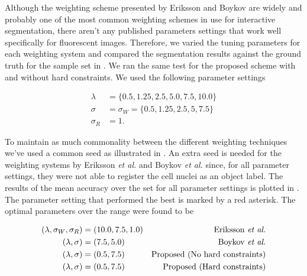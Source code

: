 Although the weighting scheme presented by Eriksson \citep{Eriksson2006} and Boykov \citep{Boykov2001_2} are widely and probably one of the most common weighting schemes in use for interactive segmentation, there aren't any published parameters settings that work well specifically for fluorescent images. Therefore, we varied the tuning parameters for each weighting system and compared the segmentation results against the ground truth for the sample set in . We ran the same test for the proposed scheme with and without hard constraints. We used the following parameter settings

\begin{align*}
	\lambda & = \{ 0.5, 1.25, 2.5, 5.0, 7.5, 10.0 \}\\
	\sigma & = \sigma_W = \{ 0.5, 1.25, 2.5, 5, 7.5 \}\\
	\sigma_R & = 1.
\end{align*}

To maintain as much commonality between the different weighting techniques we've used a common seed as illustrated in . An extra seed is needed for the weighting systems by Eriksson \textit{et al.} and Boykov \textit{et al.} since, for all parameter settings, they were not able to register the cell nuclei as an object label. The results of the mean accuracy over the set for all parameter settings is plotted in . The parameter setting that performed the best is marked by a red asterisk. The optimal parameters over the range were found to be 

\begin{align*}
	( \lambda, \sigma_W, \sigma_R ) &= (10.0, 7.5, 1.0) & \text{Eriksson \textit{et al.}}\\
	( \lambda, \sigma) &= (7.5, 5.0) & \text{Boykov \textit{et al.}}\\
	( \lambda, \sigma) &= (0.5, 7.5) & \text{Proposed (No hard constraints)}\\
	( \lambda, \sigma) &= (0.5, 7.5) & \text{Proposed (Hard constraints)}
\end{align*}

